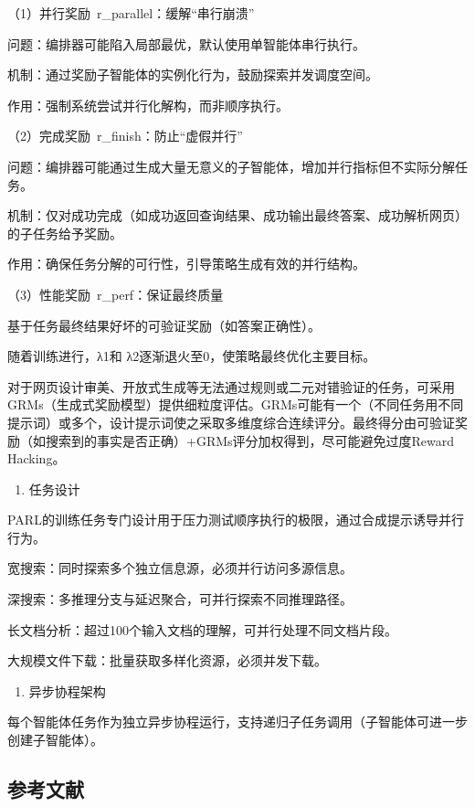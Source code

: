 （1）并行奖励~r\_parallel：缓解``串行崩溃''

问题：编排器可能陷入局部最优，默认使用单智能体串行执行。

机制：通过奖励子智能体的实例化行为，鼓励探索并发调度空间。

作用：强制系统尝试并行化解构，而非顺序执行。

（2）完成奖励~r\_finish：防止``虚假并行''

问题：编排器可能通过生成大量无意义的子智能体，增加并行指标但不实际分解任务。

机制：仅对成功完成（如成功返回查询结果、成功输出最终答案、成功解析网页）的子任务给予奖励。

作用：确保任务分解的可行性，引导策略生成有效的并行结构。

（3）性能奖励~r\_perf：保证最终质量

基于任务最终结果好坏的可验证奖励（如答案正确性）。

随着训练进行，λ1和 λ2逐渐退火至0，使策略最终优化主要目标。

对于网页设计审美、开放式生成等无法通过规则或二元对错验证的任务，可采用GRMs（生成式奖励模型）提供细粒度评估。GRMs可能有一个（不同任务用不同提示词）或多个，设计提示词使之采取多维度综合连续评分。最终得分由可验证奖励（如搜索到的事实是否正确）+GRMs评分加权得到，尽可能避免过度Reward Hacking。

\begin{enumerate}
\def\labelenumi{\arabic{enumi}.}
\setcounter{enumi}{3}
\tightlist
\item
  任务设计
\end{enumerate}

PARL的训练任务专门设计用于压力测试顺序执行的极限，通过合成提示诱导并行行为。

宽搜索：同时探索多个独立信息源，必须并行访问多源信息。

深搜索：多推理分支与延迟聚合，可并行探索不同推理路径。

长文档分析：超过100个输入文档的理解，可并行处理不同文档片段。

大规模文件下载：批量获取多样化资源，必须并发下载。

\begin{enumerate}
\def\labelenumi{\arabic{enumi}.}
\setcounter{enumi}{4}
\tightlist
\item
  异步协程架构
\end{enumerate}

每个智能体任务作为独立异步协程运行，支持递归子任务调用（子智能体可进一步创建子智能体）。

\hypertarget{ux53c2ux8003ux6587ux732e-117}{%
\subsection{参考文献}\label{ux53c2ux8003ux6587ux732e-117}}

